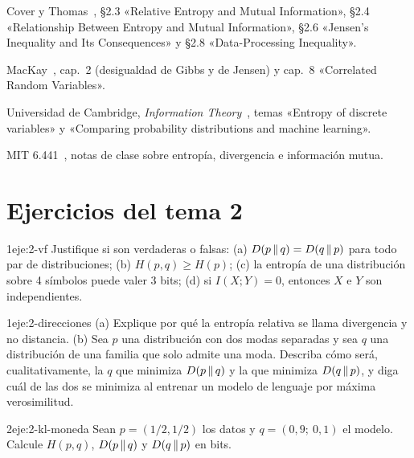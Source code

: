 \begin{lecturas}
\item Cover y Thomas~\cite{ct}, §2.3 «Relative Entropy and Mutual Information», §2.4 «Relationship Between Entropy and Mutual Information», §2.6 «Jensen's Inequality and Its Consequences» y §2.8 «Data-Processing Inequality».
\item MacKay~\cite{mackay}, cap.~2 (desigualdad de Gibbs y de Jensen) y cap.~8 «Correlated Random Variables».
\item Universidad de Cambridge, \emph{Information Theory}~\cite{camit}, temas «Entropy of discrete variables» y «Comparing probability distributions and machine learning».
\item MIT 6.441~\cite{mit6441}, notas de clase sobre entropía, divergencia e información mutua.
\end{lecturas}

\section*{Ejercicios del tema 2}

\begin{ejercicio}{1}{eje:2-vf}
Justifique si son verdaderas o falsas: (a) $D(p\,\|\,q)=D(q\,\|\,p)$ para todo par de distribuciones; (b) $H(p,q)\ge H(p)$; (c) la entropía de una distribución sobre 4 símbolos puede valer 3 bits; (d) si $I(X;Y)=0$, entonces $X$ e $Y$ son independientes.
\end{ejercicio}

\begin{ejercicio}{1}{eje:2-direcciones}
(a) Explique por qué la entropía relativa se llama divergencia y no distancia. (b) Sea $p$ una distribución con dos modas separadas y sea $q$ una distribución de una familia que solo admite una moda. Describa cómo será, cualitativamente, la $q$ que minimiza $D(p\,\|\,q)$ y la que minimiza $D(q\,\|\,p)$, y diga cuál de las dos se minimiza al entrenar un modelo de lenguaje por máxima verosimilitud.
\end{ejercicio}

\begin{ejercicio}{2}{eje:2-kl-moneda}
Sean $p=(1/2,1/2)$ los datos y $q=(0{,}9;\ 0{,}1)$ el modelo. Calcule $H(p,q)$, $D(p\,\|\,q)$ y $D(q\,\|\,p)$ en bits.
\end{ejercicio}

